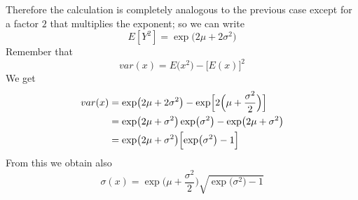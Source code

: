 \documentclass{article}
\begin{document}
\begin{ExerciseList}
{Therefore the calculation is completely analogous to the previous case except for
  a factor $2$ that multiplies the exponent; so we can write
  \begin{equation}
      E[Y^2] =  \exp\bigl( 2\mu + 2\sigma^2 \bigr)
  \end{equation}
  Remember that
  $$
  var(x) = E\bigl(x^2 \bigr) - \bigl[E(x)\bigr]^2
  $$
  We get
  \begin{equation}
  \begin{split}
      var(x) &= \exp\bigl( 2\mu + 2\sigma^2 \bigr) - 
      \exp \Bigr[ 2
      \Bigr(\mu+ \frac{\sigma^2}{2}\Bigl) \Bigr] \\
      &=
      \exp\bigl( 2\mu + \sigma^2 \bigr) \exp\bigl(\sigma^2\bigr) - 
      \exp\bigl( 2\mu + \sigma^2 \bigr) \\ 
      &=
      \exp\bigl( 2\mu + \sigma^2 \bigr) \Bigl[
      \exp\bigl(\sigma^2\bigr) - 1
      \Bigr]
  \end{split}    
  \end{equation}
  From this we obtain also
  \begin{equation}
      \sigma(x) = \exp\Biggl( \mu + \frac{\sigma^2}{2} \Biggr) \sqrt{\exp\bigl(\sigma^2\bigr) - 1}
  \end{equation}
  
  }


\end{ExerciseList}
\end{document}
